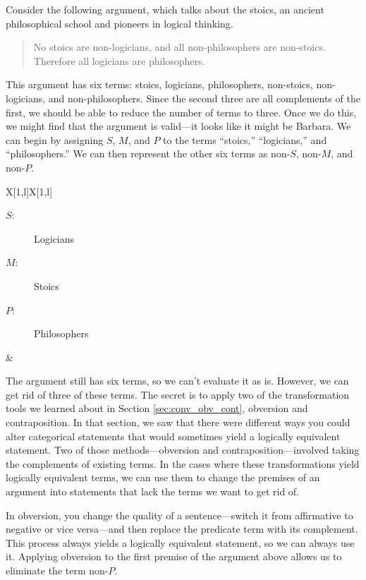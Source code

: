 Consider the following argument, which talks about the stoics, an ancient philosophical school and pioneers in logical thinking.

\begin{quotation}
No stoics are non-logicians, and all non-philosophers are non-stoics. Therefore all logicians are philosophers.
\end{quotation}

This argument has six terms: stoics, logicians, philosophers, non-stoics, non-logicians, and non-philosophers. Since the second three are all complements of the first, we should be able to reduce the number of terms to three. Once we do this, we might find that the argument is valid---it looks like it might be Barbara. We can begin by assigning $S$, $M$, and $P$ to the terms ``stoics,'' ``logicians,'' and ``philosophers.'' We can then represent the other six terms as non-$S$, non-$M$, and non-$P$.


\begin{tabu}{{X[1,l]X[1,l]}}

\begin{description}
\item[$S$:] Logicians
\item[$M$:] Stoics
\item[$P$:] Philosophers
\end{description}

&

\begin{kormanize}
\end{kormanize}

\end{tabu}

The argument still has six terms, so we can't evaluate it as is. However, we can get rid of three of these terms. The secret is to apply two of the transformation tools we learned about in Section \ref{sec:conv_obv_cont}, obversion and contraposition. In that section, we saw that there were different ways you could alter categorical statements that would sometimes yield a logically equivalent statement. Two of those methods---obversion and contraposition---involved taking the complements of existing terms. In the cases where these transformations yield logically equivalent terms, we can use them to change the premises of an argument into statements that lack the terms we want to get rid of.

In obversion, you change the quality of a sentence---switch it from affirmative to negative or vice versa---and then replace the predicate term with its complement. This process always yields a logically equivalent statement, so we can always use it. Applying obversion to the first premise of the argument above allows us to eliminate the term non-$P$.

